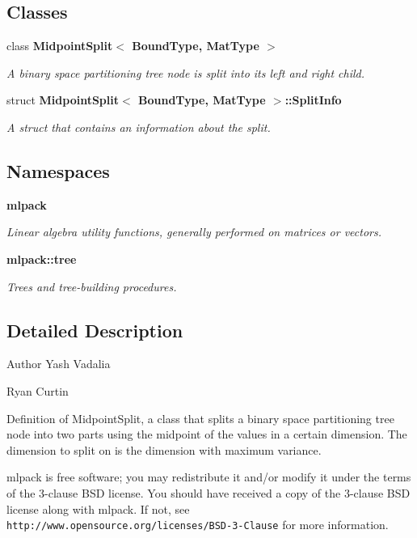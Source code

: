 \subsection*{Classes}
\begin{DoxyCompactItemize}
\item 
class \textbf{ Midpoint\+Split$<$ Bound\+Type, Mat\+Type $>$}
\begin{DoxyCompactList}\small\item\em A binary space partitioning tree node is split into its left and right child. \end{DoxyCompactList}\item 
struct \textbf{ Midpoint\+Split$<$ Bound\+Type, Mat\+Type $>$\+::\+Split\+Info}
\begin{DoxyCompactList}\small\item\em A struct that contains an information about the split. \end{DoxyCompactList}\end{DoxyCompactItemize}
\subsection*{Namespaces}
\begin{DoxyCompactItemize}
\item 
 \textbf{ mlpack}
\begin{DoxyCompactList}\small\item\em Linear algebra utility functions, generally performed on matrices or vectors. \end{DoxyCompactList}\item 
 \textbf{ mlpack\+::tree}
\begin{DoxyCompactList}\small\item\em Trees and tree-\/building procedures. \end{DoxyCompactList}\end{DoxyCompactItemize}


\subsection{Detailed Description}
\begin{DoxyAuthor}{Author}
Yash Vadalia 

Ryan Curtin
\end{DoxyAuthor}
Definition of Midpoint\+Split, a class that splits a binary space partitioning tree node into two parts using the midpoint of the values in a certain dimension. The dimension to split on is the dimension with maximum variance.

mlpack is free software; you may redistribute it and/or modify it under the terms of the 3-\/clause B\+SD license. You should have received a copy of the 3-\/clause B\+SD license along with mlpack. If not, see {\tt http\+://www.\+opensource.\+org/licenses/\+B\+S\+D-\/3-\/\+Clause} for more information. 
